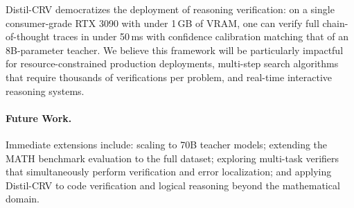 \documentclass{article}
\begin{document}
Distil-CRV democratizes the deployment of reasoning verification: on a single consumer-grade RTX 3090 with under 1\,GB of VRAM, one can verify full chain-of-thought traces in under 50\,ms with confidence calibration matching that of an 8B-parameter teacher. We believe this framework will be particularly impactful for resource-constrained production deployments, multi-step search algorithms that require thousands of verifications per problem, and real-time interactive reasoning systems.

\paragraph{Future Work.} Immediate extensions include: scaling to 70B teacher models; extending the MATH benchmark evaluation to the full dataset; exploring multi-task verifiers that simultaneously perform verification and error localization; and applying Distil-CRV to code verification and logical reasoning beyond the mathematical domain.



\end{document}
